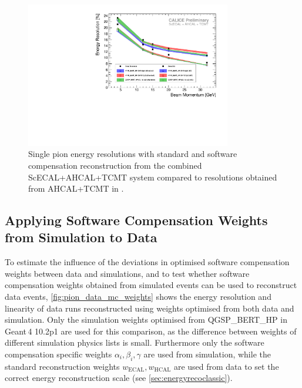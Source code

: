 \documentclass[twoside,a4paper,12pt]{article}
\begin{document}
\begin{figure}[htbp]
\begin{center}
\includegraphics[width=0.8\textwidth,page=4]{fig/pion/results/pion_resolution.pdf}
\caption{Single pion energy resolutions with standard and software compensation reconstruction from the combined ScECAL+AHCAL+TCMT system compared to resolutions obtained from AHCAL+TCMT in \cite{SCPaper}.}
\label{fig:pion_resolution_vs_ahcal}
\end{center}
\end{figure}
\subsection{Applying Software Compensation Weights from Simulation to Data}
To estimate the influence of the deviations in optimised software compensation weights between data and simulations, and to test whether software compensation weights obtained from simulated events can be used to reconstruct data events, \autoref{fig:pion_data_mc_weights} shows the energy resolution and linearity of data runs reconstructed using weights optimised from both data and simulation. Only the simulation weights optimised from QGSP\_BERT\_HP in Geant\,4 10.2p1 are used for this comparison, as the difference between weights of different simulation physics lists is small. Furthermore only the software compensation specific weights $\alpha_i, \beta_i, \gamma$ are used from simulation, while the standard reconstruction weights $w_{\text{ECAL}}, w_{\text{HCAL}}$ are used from data to set the correct energy reconstruction scale (see \autoref{sec:energyrecoclassic}).
\end{document}
